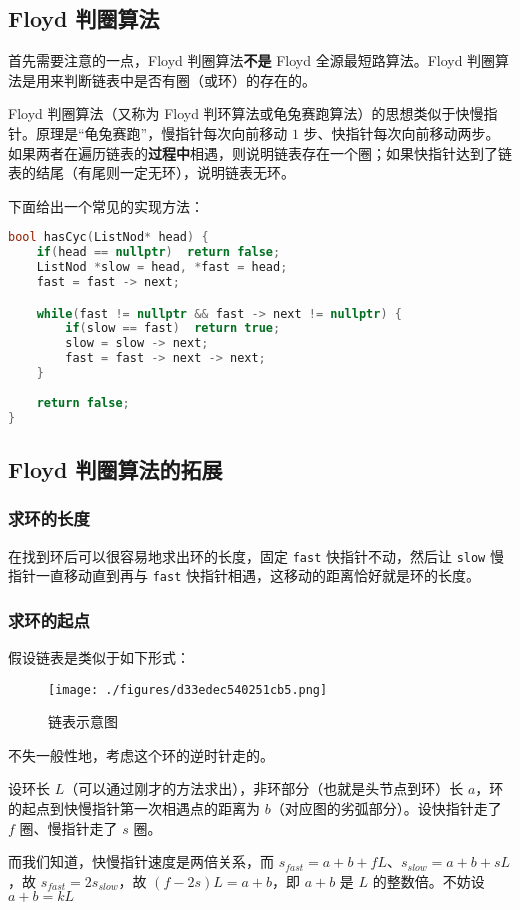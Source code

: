 
\subsection{Floyd 判圈算法}
首先需要注意的一点，Floyd 判圈算法\textbf{不是} Floyd 全源最短路算法。Floyd 判圈算法是用来判断链表中是否有圈（或环）的存在的。

Floyd 判圈算法（又称为 Floyd 判环算法或龟兔赛跑算法）的思想类似于快慢指针。原理是“龟兔赛跑”，慢指针每次向前移动 $1$ 步、快指针每次向前移动两步。如果两者在遍历链表的\textbf{过程中}相遇，则说明链表存在一个圈；如果快指针达到了链表的结尾（有尾则一定无环），说明链表无环。

下面给出一个常见的实现方法：
\begin{lstlisting}[language=cpp]
bool hasCyc(ListNod* head) {
    if(head == nullptr)  return false;
    ListNod *slow = head, *fast = head;
    fast = fast -> next;

    while(fast != nullptr && fast -> next != nullptr) {
        if(slow == fast)  return true;
        slow = slow -> next;
        fast = fast -> next -> next;
    }
    
    return false;
}
\end{lstlisting}

\subsection{Floyd 判圈算法的拓展}
\subsubsection{求环的长度}
在找到环后可以很容易地求出环的长度，固定 \verb`fast` 快指针不动，然后让 \verb`slow` 慢指针一直移动直到再与 \verb`fast` 快指针相遇，这移动的距离恰好就是环的长度。
\subsubsection{求环的起点}
假设链表是类似于如下形式：
\begin{figure}[ht]
\centering
\texttt{[image: ./figures/d33edec540251cb5.png]}
\caption{链表示意图} \label{fig_FloydC_2}
\end{figure}
不失一般性地，考虑这个环的逆时针走的。

设环长 $L$（可以通过刚才的方法求出），非环部分（也就是头节点到环）长 $a$，环的起点到快慢指针第一次相遇点的距离为 $b$（对应图的劣弧部分）。设快指针走了 $f$ 圈、慢指针走了 $s$ 圈。

而我们知道，快慢指针速度是两倍关系，而 $s_{fast} = a + b + fL$、$s_{slow} = a+ b + sL$，故 $s_{fast} = 2 s_{slow}$，故 $(f-2s)L = a+b$，即 $a+b$ 是 $L$ 的整数倍。不妨设 $a+b = k L$